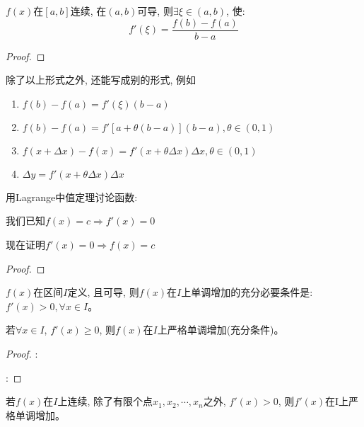 \begin{theorem}[Lagrange中值定理]
    $f(x)$在$[a, b]$连续, 在$(a, b)$可导, 则$\exists \xi \in (a, b)$, 使:
    \begin{equation*}
        f'(\xi) = \frac{f(b)-f(a)}{b-a}
    \end{equation*}
\end{theorem}
\begin{proof}
    
\end{proof}
\begin{remark}
    除了以上形式之外, 还能写成别的形式, 例如
    \begin{enumerate}
        \item $f(b)-f(a)=f'(\xi)(b-a)$
        \item $f(b)-f(a)=f'[a+\theta(b-a)](b-a), \theta \in (0, 1)$
        \item $f(x+\Delta x) - f(x) = f'(x+\theta \Delta x)\Delta x, \theta \in (0, 1)$
        \item $\Delta y = f'(x+\theta \Delta x)\Delta x$
    \end{enumerate}
\end{remark}

\begin{example}
    用Lagrange中值定理讨论函数:

    我们已知$f(x) = c \Rightarrow f'(x) = 0$

    现在证明$f'(x) = 0 \Rightarrow f(x) = c$
\end{example}
\begin{proof}
    
\end{proof}

\begin{theorem}[一阶导数与函数的单调性关系]
    $f(x)$在区间$I$定义, 且可导, 则$f(x)$在$I$上单调增加的充分必要条件是: $f'(x) > 0, \forall x \in I$。

    若$\forall x \in I$, $f'(x) \ge 0$, 则$f(x)$在$I$上严格单调增加(充分条件)。
\end{theorem}
\begin{proof}
    :

    :

\end{proof}
\begin{remark}
    若$f(x)$在$I$上连续, 除了有限个点$x_1, x_2, \cdots, x_n$之外, $f'(x)>0$, 则$f'(x)$在I上严格单调增加。
\end{remark}

